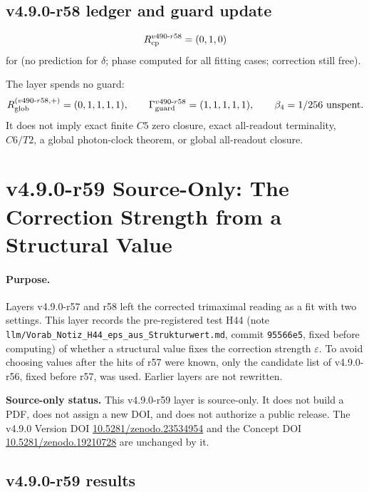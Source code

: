 \subsection*{v4.9.0-r58 ledger and guard update}
\label{subsec:v490-r58-ledger-guard}

\[
R_{\rm cp}^{v490\text{-}r58}=(0,1,0)
\]
for (no prediction for \(\delta\); phase computed for all fitting cases; correction still free).

The layer spends no guard:
\[
R_{\rm glob}^{(v490\text{-}r58,+)}=(0,1,1,1,1),
\qquad
\Gamma_{\rm guard}^{v490\text{-}r58}=(1,1,1,1,1),
\qquad
\beta_4=1/256\ \text{unspent}.
\]
It does not imply exact finite \(C5\) zero closure, exact all-readout terminality,
\(C6/T2\), a global photon-clock theorem, or global all-readout closure.

\clearpage
\section*{v4.9.0-r59 Source-Only: The Correction Strength from a Structural Value}
\label{sec:v490-r59-eps-structural}

\paragraph{Purpose.}
Layers v4.9.0-r57 and r58 left the corrected trimaximal reading as a fit with two settings.  This layer records the pre-registered test H44 (note
\texttt{llm/Vorab\_Notiz\_H44\_eps\_aus\_Strukturwert.md}, commit \texttt{95566e5}, fixed before computing) of whether a structural value fixes the correction strength
\(\varepsilon\).  To avoid choosing values after the hits of r57 were known, only the candidate list of v4.9.0-r56, fixed before r57, was used.  Earlier layers are
not rewritten.

\noindent\textbf{Source-only status.}
This v4.9.0-r59 layer is source-only.  It does not build a PDF, does not assign a new DOI,
and does not authorize a public release.  The v4.9.0 Version DOI
\href{https://doi.org/10.5281/zenodo.23534954}{10.5281/zenodo.23534954} and the Concept DOI
\href{https://doi.org/10.5281/zenodo.19210728}{10.5281/zenodo.19210728} are unchanged by it.

\subsection*{v4.9.0-r59 results}
\label{subsec:v490-r59-results}

